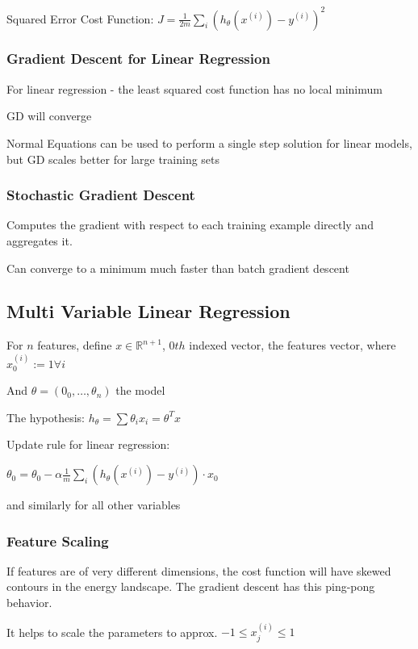 Squared Error Cost Function: $J = \frac{1}{2m}\sum_i( h_\theta(x^{(i)})-y^{(i)} )^2 $ 

\subsubsection{Gradient Descent for Linear Regression}

For linear regression - the least squared cost function has no local minimum

GD will converge 

Normal Equations can be used to perform a single step solution for linear models, but GD scales better for large training sets

\subsubsection{Stochastic Gradient Descent}

Computes the gradient with respect to each training example directly and aggregates it. 

Can  converge to a minimum much faster than batch gradient descent 

\subsection{Multi Variable Linear Regression}

For $n$ features, define $ x\in\mathbb{R}^{n+1}$, $0th$ indexed vector,  the features vector, where $x_0^{(i)} := 1 \forall i$  

And $\theta = (0_0,\dots,\theta_n)$  the model

The hypothesis: $h_{\theta} = \sum \theta_i x_i = \theta^T x$  

Update rule for linear regression:

$\theta_0 = \theta_0 -\alpha\frac{1}{m}\sum_i (h_\theta(x^{(i)})-y^{(i)})\cdot x_0$

and similarly for all other variables

\subsubsection{Feature Scaling}

If features are of very different dimensions, the cost function will have skewed contours in the energy landscape. The gradient descent has this ping-pong behavior.  

It helps to scale the parameters to approx. $-1 \le x_j^{(i)}\le 1$

